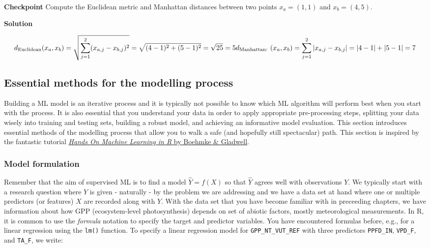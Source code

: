 \documentclass[
]{book}
\begin{document}
\textbf{Checkpoint}
Compute the Euclidean metric and Manhattan distances between two points \(x_a = (1,1)\) and \(x_b = (4, 5)\).

\textbf{Solution}

\[
d_\text{Euclidean}(x_a, x_b) = \sqrt{ \sum_{j=1}^2 (x_{a,j} - x_{b,j})^2  } =  \sqrt{ (4 - 1)^2  + (5 - 1)^2} = \sqrt{25} = 5\\
d_\text{Manhattan: }(x_a, x_b) = \sum_{j=1}^2 | x_{a,j} - x_{b,j} | = |4-1|+|5-1| = 7
\]

\hypertarget{essential-methods-for-the-modelling-process}{%
\subsection{Essential methods for the modelling process}\label{essential-methods-for-the-modelling-process}}

Building a ML model is an iterative process and it is typically not possible to know which ML algorithm will perform best when you start with the process. It is also essential that you understand your data in order to apply appropriate pre-processing steps, splitting your data wisely into training and testing sets, building a robust model, and achieving an informative model evaluation. This section introduces essential methods of the modelling process that allow you to walk a safe (and hopefully still spectacular) path. This section is inspired by the fantastic tutorial \href{https://bradleyboehmke.github.io/HOML}{\emph{Hands On Machine Learning in R} by Boehmke \& Gladwell}.

\hypertarget{model-formulation}{%
\subsubsection{Model formulation}\label{model-formulation}}

Remember that the aim of supervised ML is to find a model \(\hat{Y} = f(X)\) so that \(\hat{Y}\) agrees well with observations \(Y\). We typically start with a research question where \(Y\) is given - naturally - by the problem we are addressing and we have a data set at hand where one or multiple predictors (or features) \(X\) are recorded along with \(Y\). With the data set that you have become familiar with in preceeding chapters, we have information about how GPP (ecosystem-level photosynthesis) depends on set of abiotic factors, mostly meteorological measurements. In R, it is common to use the \emph{formula} notation to specify the target and predictor variables. You have encountered formulas before, e.g., for a linear regression using the \texttt{lm()} function. To specify a linear regression model for \texttt{GPP\_NT\_VUT\_REF} with three predictors \texttt{PPFD\_IN}, \texttt{VPD\_F}, and \texttt{TA\_F}, we write:
\end{document}
